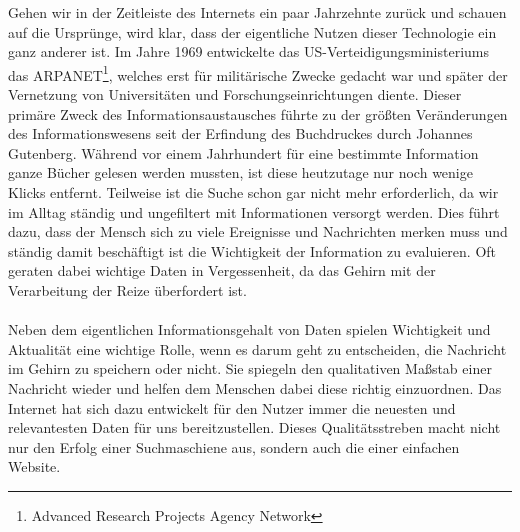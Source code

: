 Gehen wir in der Zeitleiste des Internets ein paar Jahrzehnte zurück und schauen auf die Ursprünge, wird klar, dass der eigentliche Nutzen dieser Technologie ein ganz anderer ist. Im Jahre 1969 entwickelte das US-Verteidigungsministeriums das ARPANET\footnote{Advanced Research Projects Agency Network}, welches erst für militärische Zwecke gedacht war und später der Vernetzung von Universitäten und Forschungseinrichtungen diente. Dieser primäre Zweck des Informationsaustausches führte zu der größten Veränderungen des Informationswesens seit der Erfindung des Buchdruckes durch Johannes Gutenberg. Während vor einem Jahrhundert für eine bestimmte Information ganze Bücher gelesen werden mussten, ist diese heutzutage nur noch wenige \glqq Klicks\grqq{} entfernt. Teilweise ist die Suche schon gar nicht mehr erforderlich, da wir im Alltag ständig und ungefiltert mit Informationen versorgt werden. Dies führt dazu, dass der Mensch sich zu viele Ereignisse und Nachrichten merken muss und ständig damit beschäftigt ist die Wichtigkeit der Information zu evaluieren. Oft geraten dabei wichtige Daten in Vergessenheit, da das Gehirn mit der Verarbeitung der Reize überfordert ist.\\
\\
Neben dem eigentlichen Informationsgehalt von Daten spielen Wichtigkeit und Aktualität eine wichtige Rolle, wenn es darum geht zu entscheiden, die Nachricht im Gehirn zu speichern oder nicht. Sie spiegeln den qualitativen Maßstab einer Nachricht wieder und helfen dem Menschen dabei diese richtig einzuordnen. Das Internet hat sich dazu entwickelt für den Nutzer immer die neuesten und relevantesten Daten für uns bereitzustellen. Dieses Qualitätsstreben macht nicht nur den Erfolg einer Suchmaschiene aus, sondern auch die einer einfachen Website.



